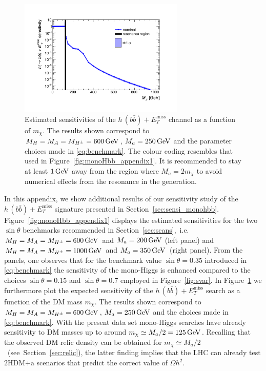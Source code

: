 \documentclass[a4paper, 11pt,notoc]{article}
\newcommand{\MET}{\ensuremath{E_T^\mathrm{miss}}\xspace}
\newcommand{\mA}{\ensuremath{M_{A}}\xspace}
\newcommand{\ma}{\ensuremath{M_{a}}\xspace}
\newcommand{\mH}{\ensuremath{M_{H}}\xspace}
\newcommand{\mHc}{\ensuremath{M_{H^{\pm}}}\xspace}
\newcommand{\hdma}{\ensuremath{\textrm{2HDM+a}}\xspace}
\begin{document}
\begin{figure}[t!]
\centering
\includegraphics[width=0.7\textwidth]{monoHbb_sensi_mDM_scan_red.pdf}
\vspace{-2mm}
\caption{Estimated sensitivities of  the $h \, (b \bar b)+\MET$ channel as a function of $m_\chi$. The  results shown correspond to $\mH = \mA = \mHc = 600 \, {\rm GeV}$, $\ma = 250 \, {\rm GeV}$ and the parameter choices made in \eqref{eq:benchmark}. The colour coding resembles that used in Figure~\ref{fig:monoHbb_appendix1}. It is recommended to stay at least $1 \, {\rm GeV}$ away from the region where $\ma = 2 m_\chi$ to avoid numerical effects from the resonance in the generation. }
\label{fig:monoHbb_appendix2}
\end{figure}

In this appendix, we  show additional results  of our sensitivity study of the $h \, (b \bar b)+\MET$ signature presented in Section~\ref{sec:sensi_monohbb}. Figure~\ref{fig:monoHbb_appendix1} displays the estimated sensitivities for the two $\sin \theta$ benchmarks recommended in Section~\ref{sec:scans},~i.e.~$\mH = \mA = \mHc = 600 \, {\rm GeV}$ and $\ma = 200 \, {\rm GeV}$ (left panel) and $\mH = \mA = \mHc = 1000 \, {\rm GeV}$ and $\ma = 350 \, {\rm GeV}$~(right panel). From the panels, one observes that for the benchmark value $\sin \theta = 0.35$ introduced in \eqref{eq:benchmark} the sensitivity of the mono-Higgs is enhanced compared to the choices  $\sin \theta = 0.15$ and  $\sin \theta = 0.7$ employed in Figure~\ref{fig:svar}. In Figure~\ref{fig:monoHbb_appendix2} we furthermore  plot the expected sensitivity of the $h \, (b \bar b)+\MET$ search as a function of the DM mass $m_\chi$. The  results shown correspond to $\mH = \mA = \mHc = 600 \, {\rm GeV}$, $\ma = 250 \, {\rm GeV}$ and the choices made in \eqref{eq:benchmark}. With the present data set mono-Higgs searches have already sensitivity to DM masses up to around $m_\chi \simeq \ma/2 = 125 \, {\rm GeV}$. Recalling that the  observed DM relic density can be obtained for $m_\chi \simeq \ma/2$ ~(see~Section~\ref{sec:relic}), the latter finding implies that the LHC can already test  \hdma scenarios that predict the correct value of $\Omega h^2$. 

\newpage 



\end{document}
